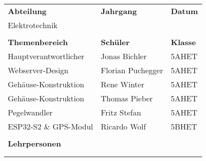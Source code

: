 \begin{titlingpage}
	\renewcommand{\arraystretch}{1.5}
	\begin{table}[H]
		\begin{tabular}{p{6cm} p{5cm} p{3.75cm}}
			\textbf{Abteilung}     & \textbf{Jahrgang} & \hspace{1cm} \textbf{Datum}  \\
			Elektrotechnik         & \iYear            & \hspace{1cm} \iDate          \\
			                       &                   &                              \\
			\textbf{Themenbereich} & \textbf{Schüler}  & \hspace{1cm} \textbf{Klasse} \\
			Hauptverantwortlicher  & Jonas Bichler     & \hspace{1cm} 5AHET           \\
			Webserver-Design       & Florian Puchegger & \hspace{1cm} 5AHET           \\
			Gehäuse-Konstruktion   & Rene Winter       & \hspace{1cm} 5AHET           \\
			Gehäuse-Konstruktion   & Thomas Pieber     & \hspace{1cm} 5AHET           \\
			Pegelwandler           & Fritz Stefan      & \hspace{1cm} 5AHET           \\
			ESP32-S2 \& GPS-Modul  & Ricardo Wolf      & \hspace{1cm} 5BHET           \\
			                       &                   &                              \\
			\textbf{Lehrpersonen}  &                   &                              \\
			\multicolumn{3}{l}{\iCoachOne}                                            \\
			\multicolumn{3}{l}{\iCoachTwo}
		\end{tabular}
	\renewcommand{\arraystretch}{1}
	\end{table}
\end{titlingpage}

\newpage
\tableofcontents
\newpage


